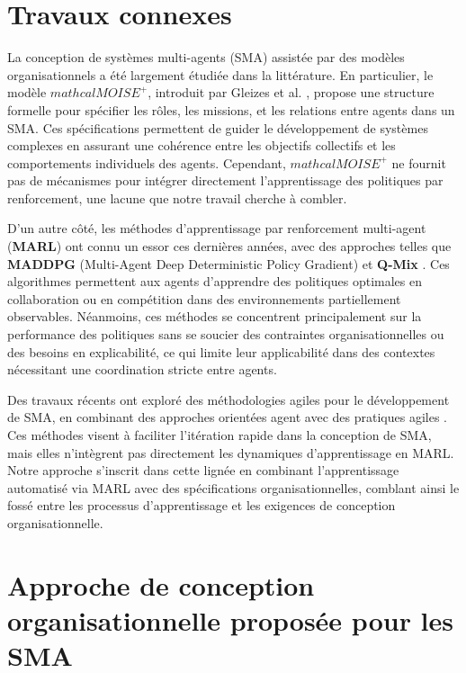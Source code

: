 \documentclass[sigconf,anonymous]{aamas}
\begin{document}
\section{Travaux connexes}
\label{sec:related_works}
La conception de systèmes multi-agents (SMA) assistée par des modèles organisationnels a été largement étudiée dans la littérature. En particulier, le modèle \textbf{$mathcal{M}OISE^+$}, introduit par Gleizes et al. \cite{gleize2008moise}, propose une structure formelle pour spécifier les rôles, les missions, et les relations entre agents dans un SMA. Ces spécifications permettent de guider le développement de systèmes complexes en assurant une cohérence entre les objectifs collectifs et les comportements individuels des agents. Cependant, $mathcal{M}OISE^+$ ne fournit pas de mécanismes pour intégrer directement l'apprentissage des politiques par renforcement, une lacune que notre travail cherche à combler.

D'un autre côté, les méthodes d'apprentissage par renforcement multi-agent (\textbf{MARL}) ont connu un essor ces dernières années, avec des approches telles que \textbf{MADDPG} (Multi-Agent Deep Deterministic Policy Gradient) \cite{lowe2017multi} et \textbf{Q-Mix} \cite{rashid2018qmix}. Ces algorithmes permettent aux agents d'apprendre des politiques optimales en collaboration ou en compétition dans des environnements partiellement observables. Néanmoins, ces méthodes se concentrent principalement sur la performance des politiques sans se soucier des contraintes organisationnelles ou des besoins en explicabilité, ce qui limite leur applicabilité dans des contextes nécessitant une coordination stricte entre agents.

Des travaux récents ont exploré des méthodologies agiles pour le développement de SMA, en combinant des approches orientées agent avec des pratiques agiles \cite{winikoff2021agile}. Ces méthodes visent à faciliter l'itération rapide dans la conception de SMA, mais elles n'intègrent pas directement les dynamiques d'apprentissage en MARL. Notre approche s'inscrit dans cette lignée en combinant l'apprentissage automatisé via MARL avec des spécifications organisationnelles, comblant ainsi le fossé entre les processus d'apprentissage et les exigences de conception organisationnelle.

\section{Approche de conception organisationnelle proposée pour les SMA}
\label{sec:apprdeah}
\end{document}
